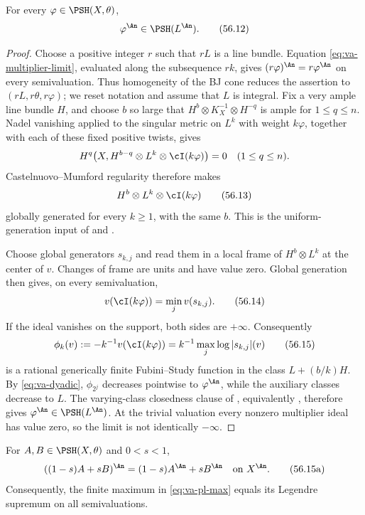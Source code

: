 \begin{theorem}\label{thm:va-single-potential-bj-psh}
For every $\varphi\in\PSH(X,\theta)$,
\[
                          \varphi^{\An}\in\PSH(L^{\An}).
\tag{56.12}\label{eq:va-single-psh}
\]
\end{theorem}

\begin{proof}
Choose a positive integer $r$ such that $rL$ is a line bundle.
Equation \eqref{eq:va-multiplier-limit}, evaluated along the subsequence
$rk$, gives $(r\varphi)^{\An}=r\varphi^{\An}$ on every
semivaluation. Thus homogeneity of the BJ cone reduces the assertion
to $(rL,r\theta,r\varphi)$;
we reset notation and assume that $L$ is integral.
Fix a very ample line bundle $H$, and choose $b$ so large that
$H^b\otimes K_X^{-1}\otimes H^{-q}$ is ample for
$1\leq q\leq n$. Nadel vanishing applied to the singular metric
on $L^k$ with weight $k\varphi$, together with each of these fixed
positive twists, gives
\[
 H^q\bigl(X,H^{b-q}\otimes L^k\otimes\cI(k\varphi)\bigr)=0
                       \quad(1\leq q\leq n).
\]
Castelnuovo--Mumford regularity therefore makes
\[
 H^b\otimes L^k\otimes\cI(k\varphi)
\tag{56.13}\label{eq:va-global-generation}
\]
globally generated for every $k\geq1$, with the same $b$.
This is the uniform-generation input of
\cite[Theorem~6.27]{DemAMAGAuthor2011} and \cite[Lemma~3.5]{DXZ23}.

Choose global generators $s_{k,j}$ and read them in a local frame
of $H^b\otimes L^k$ at the center of $v$. Changes of frame are
units and have value zero. Global generation then gives, on every
semivaluation,
\[
 v(\cI(k\varphi))=\min_jv(s_{k,j}).
\tag{56.14}\label{eq:va-generator-min}
\]
If the ideal vanishes on the support, both sides are $+\infty$.
Consequently
\[
 \phi_k(v):=-k^{-1}v(\cI(k\varphi))
       =k^{-1}\max_j\log|s_{k,j}|(v)
\tag{56.15}\label{eq:va-gf-stage}
\]
is a rational generically finite Fubini--Study function in the class
$L+(b/k)H$. By \eqref{eq:va-dyadic}, $\phi_{2^j}$ decreases
pointwise to $\varphi^{\An}$, while the auxiliary classes decrease
to $L$. The varying-class closedness clause of ,
equivalently \cite[Theorem~4.5, property (PSH2)]{BJ22}, therefore gives
$\varphi^{\An}\in\PSH(L^{\An})$.
At the trivial valuation every nonzero multiplier ideal has value
zero, so the limit is not identically $-\infty$.
\end{proof}

\par\medskip\noindent\begin{minipage}{\linewidth}
\begin{proposition}
\label{prop:va-affine-compatibility}
For $A,B\in\PSH(X,\theta)$ and $0<s<1$,
\[
 ((1-s)A+sB)^{\An}=(1-s)A^{\An}+sB^{\An}
                          \quad\text{on }X^{\An}.
\tag{56.15a}\label{eq:va-affine-compatibility}
\]
Consequently, the finite maximum in \eqref{eq:va-pl-max} equals its
Legendre supremum on all semivaluations.
\end{proposition}
\end{minipage}\par\medskip


